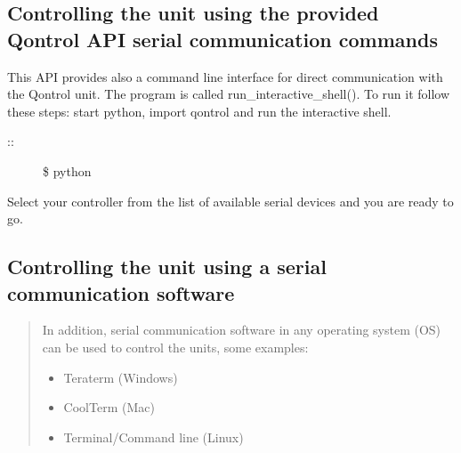 \documentclass[letterpaper,10pt,english]{sphinxmanual}
\begin{document}
\subsection{Controlling the unit using the provided Qontrol API serial communication commands}
\label{\detokenize{guide/getting_started:controlling-the-unit-using-the-provided-qontrol-api-serial-communication-commands}}
This API provides also a command line interface for direct communication with the Qontrol unit.
The program is called run\_interactive\_shell(). To run it follow these steps: start python, import qontrol and run the interactive shell.
\begin{description}
\item[{::}] \leavevmode
\$ python

%
\begin{sphinxVerbatim}[commandchars=\\\{\}]
 
\end{sphinxVerbatim}

%
\begin{sphinxVerbatim}[commandchars=\\\{\}]
\end{sphinxVerbatim}

\end{description}

Select your controller from the list of available serial devices and you are ready to go.


\subsection{Controlling the unit using a serial communication software}
\label{\detokenize{guide/getting_started:controlling-the-unit-using-a-serial-communication-software}}\begin{quote}

In addition, serial communication software in any operating system (OS) can be used to control the units, some examples:
\begin{itemize}
\item {} 
Teraterm (Windows)

\item {} 
CoolTerm (Mac)

\item {} 
Terminal/Command line (Linux)

\end{itemize}
\end{quote}
\end{document}
